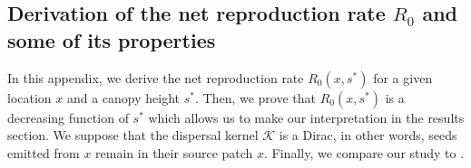 \documentclass[letterpaper, 12pt]{article}
\newcommand {\s}{{s}^{*}}
\newcommand {\K}{\mathcal{K}}
\theoremstyle{theo}
\begin{document}
\tableofcontents
\listoftables
\listoffigures

\begin{refsection}
\begin{onehalfspace}

\section{Derivation of the net reproduction rate $ R_0 $ and some of its properties} \label{app::calc_R0}
In this appendix, we derive the net reproduction rate $ R_0(x, \s) $ for a given location $ x $ and a canopy height $ \s $. Then, we prove that $ R_0(x, \s) $ is a decreasing function of $ \s $ which allows us to make our interpretation in the results section. We suppose that the dispersal kernel $ \K $ is a Dirac, in other words, seeds emitted from $ x $ remain in their source patch $ x $. Finally, we compare our study to \citet{Purves2009}.


\end{onehalfspace}
\end{refsection}
\end{document}
